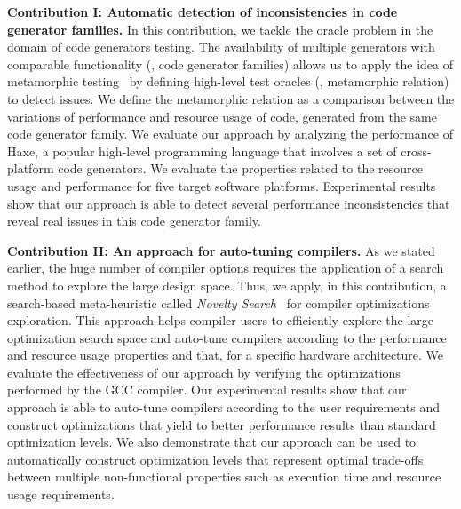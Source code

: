 \textbf{Contribution I: Automatic detection of inconsistencies in code generator families.}
In this contribution, we tackle the oracle problem in the domain of code generators testing.
The availability of multiple generators with comparable functionality (\ie, code generator families) allows us to apply the idea of metamorphic testing~\cite{zhou2004metamorphic} by defining high-level test oracles (\ie, metamorphic relation) to detect issues. We define the metamorphic relation as a comparison between the variations of performance and resource usage of code, generated from the same code generator family.
We evaluate our approach by analyzing the performance of Haxe, a popular high-level programming language that involves a set of cross-platform code generators. We evaluate the properties related to the resource usage and performance for five target software platforms. Experimental results show that our approach is able to detect several performance inconsistencies that reveal real issues in this code generator family. 

\textbf{Contribution II: An approach for auto-tuning compilers.}
As we stated earlier, the huge number of compiler options requires the application of a search method to explore the large design space. Thus, we apply, in this contribution, a search-based meta-heuristic called \textit{Novelty Search}~\cite{lehman2008exploiting} for compiler optimizations exploration. This approach helps compiler users to efficiently explore the large optimization search space and auto-tune compilers according to the performance and resource usage properties and that, for a specific hardware architecture. 
We evaluate the effectiveness of our approach by verifying the optimizations performed by the GCC compiler.
Our experimental results show that our approach is able to auto-tune compilers according to the user requirements and construct optimizations that yield to better performance results than standard optimization levels. We also demonstrate that our approach can be used to automatically construct optimization levels that represent optimal trade-offs between multiple non-functional properties such as execution time and resource usage requirements.

